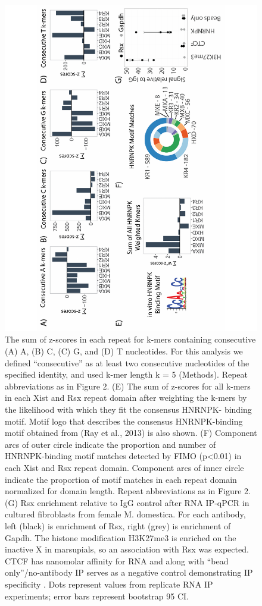 \begin{figure}[h!]
\centering
\includegraphics[angle=-90, width=.95\textwidth]{images/fig4_G-01.pdf}
\caption[Sequence and motif content in tandem repeats]{The sum of z-scores in each repeat for k-mers containing consecutive (A) A, (B) C, (C) G, and (D) T nucleotides. For this analysis we defined “consecutive” as at least two consecutive nucleotides of the specified identity, and used k-mer length k = 5 (Methods). Repeat abbreviations as in Figure 2. (E) The sum of z-scores for all k-mers in each Xist and Rsx repeat domain after weighting the k-mers by the likelihood with which they fit the consensus HNRNPK- binding motif. Motif logo that describes the consensus HNRNPK-binding motif obtained from (Ray et al., 2013) is also shown. (F) Component arcs of outer circle indicate the proportion and number of HNRNPK-binding motif matches detected by FIMO (p<0.01) in each Xist and Rsx repeat domain. Component arcs of inner circle indicate the proportion of motif matches in each repeat domain normalized for domain length. Repeat abbreviations as in Figure 2. (G) Rsx enrichment relative to IgG control after RNA IP-qPCR in cultured fibroblasts from female M. domestica. For each antibody, left (black) is enrichment of Rsx, right (grey) is enrichment of Gapdh. The histone modification H3K27me3 is enriched on the inactive X in marsupials, so an association with Rsx was expected. CTCF has nanomolar affinity for RNA and along with “bead only”/no-antibody IP serves as a negative control demonstrating IP specificity \cite{Kung2015Locus-specificCTCF}. Dots represent values from replicate RNA IP experiments; error bars represent bootstrap 95 CI.}
\end{figure}

